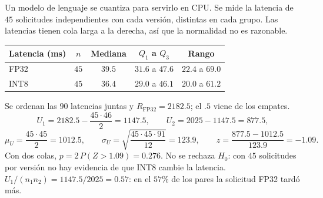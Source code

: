 \documentclass[11pt,letterpaper]{article}
\begin{document}
\begin{ejemplo}
    Un modelo de lenguaje se cuantiza para servirlo en CPU. Se mide la
    latencia de $45$ solicitudes independientes con cada versión,
    distintas en cada grupo. Las latencias tienen cola larga a la
    derecha, así que la normalidad no es razonable.
    \begin{center}
    \small
    \begin{tabular}{lcccc}
        \toprule
        \textbf{Latencia (ms)} & $n$ & \textbf{Mediana}
        & \textbf{$Q_1$ a $Q_3$} & \textbf{Rango} \\
        \midrule
        FP32 & $45$ & $39.5$ & $31.6$ a $47.6$ & $22.4$ a $69.0$ \\
        INT8 & $45$ & $36.4$ & $29.0$ a $46.1$ & $20.0$ a $61.2$ \\
        \bottomrule
    \end{tabular}
    \end{center}
    Se ordenan las $90$ latencias juntas y
    $R_{\text{FP32}} = 2182.5$; el $.5$ viene de los empates.
    \[
        U_1 = 2182.5 - \frac{45 \cdot 46}{2} = 1147.5 ,
        \qquad
        U_2 = 2025 - 1147.5 = 877.5 ,
    \]
    \[
        \mu_U = \frac{45 \cdot 45}{2} = 1012.5 ,
        \qquad
        \sigma_U = \sqrt{\frac{45 \cdot 45 \cdot 91}{12}} = 123.9 ,
        \qquad
        z = \frac{877.5 - 1012.5}{123.9} = -1.09 .
    \]
    Con dos colas, $p = 2\, P(Z > 1.09) = 0.276$. No se rechaza
    $H_0$: con $45$ solicitudes por versión no hay evidencia de que
    INT8 cambie la latencia. $U_1 / (n_1 n_2) = 1147.5 / 2025 = 0.57$:
    en el $57\%$ de los pares la solicitud FP32 tardó más.
\end{ejemplo}

\begin{center}
\end{center}
\end{document}
